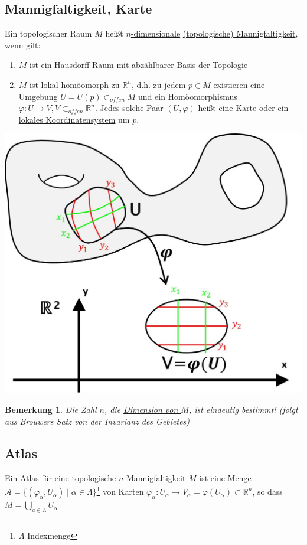 \documentclass[a4paper,11pt,notitlepage]{report}
\newtheorem{remark}{Bemerkung}[chapter]
\newcommand{\R}{{\ensuremath{\mathbb{R}}}}
\newenvironment{Kasten}[1]
{
\hspace{0.05\linewidth}
\begin{center}
\begin{minipage}{0.9\linewidth}
\setlength{\fboxsep}{10pt}
\definecolor{shadecolor}{gray}{1}
\definecolor{framecolor}{gray}{0}
\def\FrameCommand{\fcolorbox{framecolor}{shadecolor}}
\MakeFramed {\FrameRestore}
\subsection{#1}
\begin{itshape}
}
{
\end{itshape}
\endMakeFramed
\end{minipage}
\end{center}
}
\begin{document}
\begin{Kasten}{Mannigfaltigkeit, Karte}
	Ein topologischer Raum $M$ heißt \underline{$n$-dimensionale} \underline{(topologische) Mannigfaltigkeit}, wenn gilt:
	\begin{enumerate}
		\item $M$ ist ein Hausdorff-Raum mit abzählbarer Basis der Topologie
		\item $M$ ist lokal homöomorph zu $\R^n$, d.h. zu jedem $p \in M$ existieren eine Umgebung $U=U(p) \subset_{offen} M$ und ein Homöomorphismus $\varphi \colon U \rightarrow V, V \subset_{offen} \R^n$.
			\newline
			Jedes solche Paar $(U,\varphi)$ heißt eine \underline{Karte} oder ein \underline{lokales Koordinatensystem} um $p$.
	\end{enumerate}
\end{Kasten}
\includegraphics[scale=0.4]{images/Karte.jpg} 
 
\begin{remark}
	Die Zahl $n$, die \underline{Dimension von $M$}, ist eindeutig bestimmt!
	(folgt aus Brouwers Satz von der Invarianz des Gebietes) 
\end{remark}

\begin{Kasten}{Atlas}
	Ein \underline{Atlas} für eine topologische $n$-Mannigfaltigkeit $M$ ist eine Menge $\mathcal{A} = \{(\varphi_\alpha, U_\alpha) \mid \alpha \in \Lambda\}$\footnote{$\Lambda$ Indexmenge}
	von Karten $\varphi_\alpha \colon U_\alpha \rightarrow V_\alpha = \varphi(U_\alpha) \subset \R^n$, so dass $M = \bigcup\limits_{a \in \Lambda}{U_\alpha}$
\end{Kasten}
\end{document}
